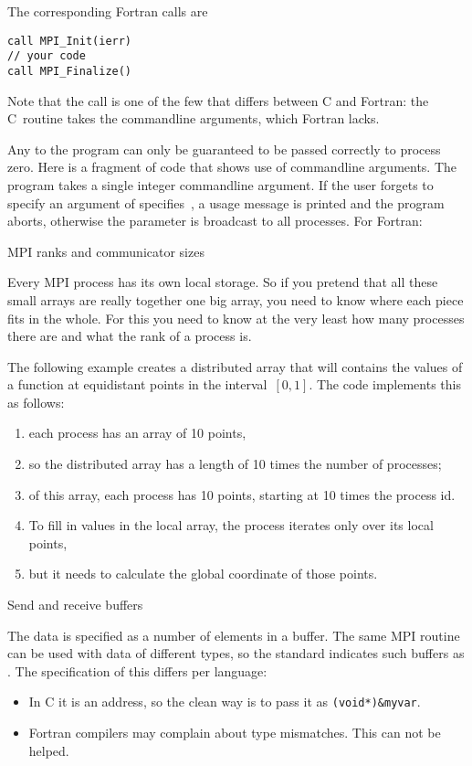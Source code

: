 The corresponding Fortran calls are
\begin{verbatim}
call MPI_Init(ierr)
// your code
call MPI_Finalize()
\end{verbatim}
Note that the  call is one of the few that differs between C and Fortran:
the C~routine takes the commandline arguments, which Fortran lacks.

Any  to the program can only be
guaranteed to be passed correctly to process zero. Here is a fragment
of code that shows use of commandline arguments.  The program
 takes a single integer commandline argument.
If the user forgets to specify an argument of specifies~, a
usage message is printed and the program aborts, otherwise the
parameter is broadcast to all processes.  
%
%
For Fortran:
%

 {MPI ranks and communicator sizes}

Every MPI process has its own local storage. So if you pretend that all these
small arrays are really together one big array, you need to know where each 
piece fits in the whole. For this you need to know at the very least
how many processes there are and what the rank of a process is.

The following example creates a distributed array that will contains
the values of a function at equidistant points in the interval~$[0,1]$.
The code implements this as follows:
\begin{enumerate}
\item each process has an array of 10 points,
\item so the distributed array has a length of 10 times the number of processes;
\item of this array, each process has 10 points, starting at 10 times
  the process id.
\item To fill in values in the local array, the process iterates only
  over its local points,
\item but it needs to calculate the global coordinate of those points.
\end{enumerate}
 

 {Send and receive buffers}

The data is specified as a number of elements in a buffer. The same
MPI routine can be used with data of different types, so the standard
indicates such buffers as . The specification of
this differs per language:
\begin{itemize}
\item In C it is an address, so the clean way is to pass it as
  \verb+(void*)&myvar+.
\item Fortran compilers may complain about type mismatches. This can
  not be helped.
\end{itemize}

